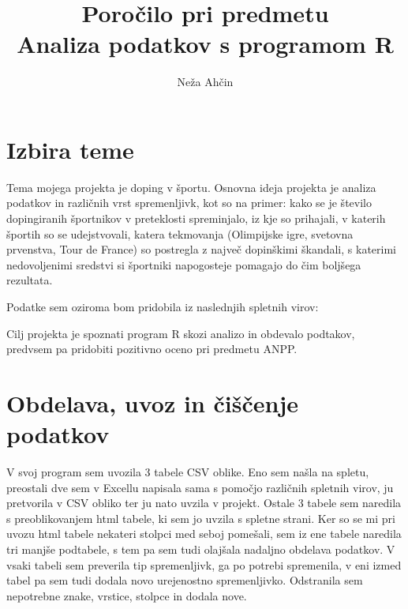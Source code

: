 \documentclass[11pt,a4paper]{article}
\begin{document}
\title{Poročilo pri predmetu \\
Analiza podatkov s programom R}
\author{Neža Ahčin}
\maketitle
\newpage
\section{Izbira teme}

Tema mojega projekta je doping v športu. Osnovna ideja projekta je analiza podatkov in različnih vrst spremenljivk, kot so na primer: kako se je število dopingiranih športnikov v preteklosti spreminjalo, iz kje so prihajali, v katerih športih so se udejstvovali, katera tekmovanja (Olimpijske igre, svetovna prvenstva, Tour de France) so postregla z največ dopinškimi škandali, s katerimi nedovoljenimi sredstvi si športniki napogosteje pomagajo do čim boljšega rezultata.

Podatke sem oziroma bom pridobila iz naslednjih spletnih virov:
 

Cilj projekta je spoznati program R skozi analizo in obdevalo podtakov, predvsem pa pridobiti pozitivno oceno pri predmetu ANPP.

\newpage

\section{Obdelava, uvoz in čiščenje podatkov}

V svoj program sem uvozila 3 tabele CSV oblike. Eno sem našla na spletu, preostali dve sem v Excellu napisala sama s pomočjo različnih spletnih virov, ju pretvorila v CSV obliko ter ju nato uvzila v projekt. Ostale 3 tabele sem naredila s preoblikovanjem html tabele, ki sem jo uvzila s spletne strani. Ker so se mi pri uvozu html tabele nekateri stolpci med seboj pomešali, sem iz ene tabele naredila tri manjše podtabele, s tem pa sem tudi olajšala nadaljno obdelava podatkov. V vsaki tabeli sem preverila tip spremenljivk, ga po potrebi spremenila, v eni izmed tabel pa sem tudi dodala novo urejenostno spremenljivko. Odstranila sem nepotrebne znake, vrstice, stolpce in dodala nove. 
\end{document}
